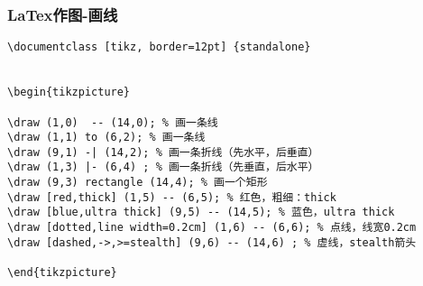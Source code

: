 \begin{frame}[fragile]
\frametitle{LaTex作图-画线}

\begin{lstlisting}
\documentclass [tikz, border=12pt] {standalone}


\begin{tikzpicture}

\draw (1,0)  -- (14,0); % 画一条线
\draw (1,1) to (6,2); % 画一条线
\draw (9,1) -| (14,2); % 画一条折线（先水平，后垂直）
\draw (1,3) |- (6,4) ; % 画一条折线（先垂直，后水平）
\draw (9,3) rectangle (14,4); % 画一个矩形
\draw [red,thick] (1,5) -- (6,5); % 红色，粗细：thick
\draw [blue,ultra thick] (9,5) -- (14,5); % 蓝色，ultra thick
\draw [dotted,line width=0.2cm] (1,6) -- (6,6); % 点线，线宽0.2cm
\draw [dashed,->,>=stealth] (9,6) -- (14,6) ; % 虚线，stealth箭头

\end{tikzpicture}

\end{lstlisting}
\end{frame}